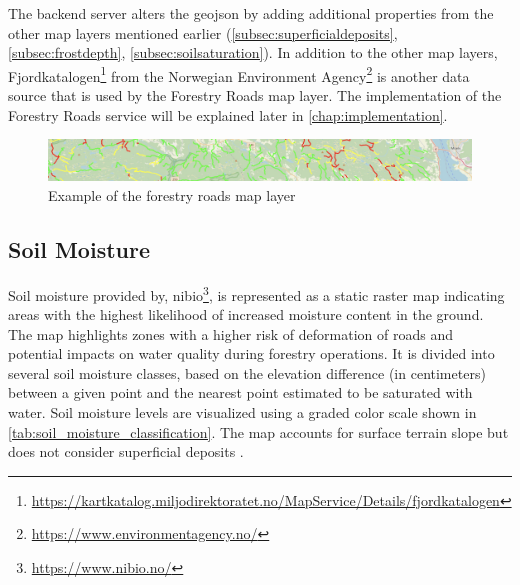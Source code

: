 The backend server alters the \gls{geojson} by adding additional properties from the other map layers mentioned earlier (\ref{subsec:superficialdeposits}, \ref{subsec:frostdepth}, \ref{subsec:soilsaturation}). In addition to the other map layers, Fjordkatalogen\footnote{\url{https://kartkatalog.miljodirektoratet.no/MapService/Details/fjordkatalogen}} from the Norwegian Environment Agency\footnote{\url{https://www.environmentagency.no/}} is another data source that is used by the Forestry Roads map layer. The implementation of the Forestry Roads service will be explained later in \autoref{chap:implementation}. 

\begin{figure}[h]
    \centering
    \includegraphics[width=1\linewidth]{images/maplayers/forestryroad.png}
    \caption{Example of the forestry roads map layer}
    \label{fig:maplayer:forestryroads}
\end{figure}

\subsection{Soil Moisture}

Soil moisture provided by, \acrfull{nibio}\footnote{\url{https://www.nibio.no/}}, is represented as a static raster map indicating areas with the highest likelihood of increased moisture content in the ground. The map highlights zones with a higher risk of deformation of roads and potential impacts on water quality during forestry operations. It is divided into several soil moisture classes, based on the elevation difference (in centimeters) between a given point and the nearest point estimated to be saturated with water. Soil moisture levels are visualized using a graded color scale shown in \autoref{tab:soil_moisture_classification}. The map accounts for surface terrain slope but does not consider superficial deposits \cite{geonorge_soil_moisture}.

